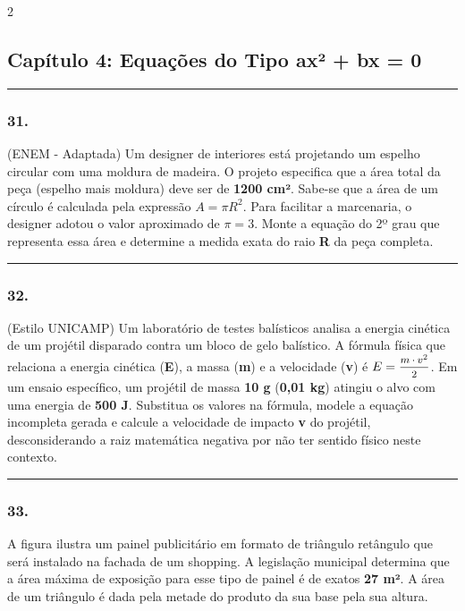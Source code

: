 \documentclass[twoside, 10pt, a4paper]{article}
\newlength{\espacoPosTitulo}\setlength{\espacoPosTitulo}{0.3cm}
\newlength{\espacoPreQuestao}\setlength{\espacoPreQuestao}{0.1cm}
\newlength{\espacoQuestao}\setlength{\espacoQuestao}{0.2cm}
\begin{document}
\begin{multicols*}{2}
\subsection*{Capítulo 4: Equações do Tipo ax² + bx = 0}
\vspace{-0.2cm}\noindent\rule{\linewidth}{1.5pt} 
\par\vspace{\espacoPosTitulo}
\subsubsection*{31.} (ENEM - Adaptada) Um designer de interiores está projetando um espelho circular com uma moldura de madeira. O projeto especifica que a área total da peça (espelho mais moldura) deve ser de \textbf{1200 cm²}. Sabe-se que a área de um círculo é calculada pela expressão $ A = \pi R^2 $. Para facilitar a marcenaria, o designer adotou o valor aproximado de $ \pi = 3 $. Monte a equação do 2º grau que representa essa área e determine a medida exata do raio \textbf{R} da peça completa.
\par\vspace{\espacoQuestao}

\noindent\textcolor{CorLinha}{\rule{\linewidth}{0.5pt}} 
\par\vspace{\espacoPreQuestao}
\subsubsection*{32.} (Estilo UNICAMP) Um laboratório de testes balísticos analisa a energia cinética de um projétil disparado contra um bloco de gelo balístico. A fórmula física que relaciona a energia cinética (\textbf{E}), a massa (\textbf{m}) e a velocidade (\textbf{v}) é $ E = \mfrac{m \cdot v^2}{2} $. Em um ensaio específico, um projétil de massa \textbf{10 g} (\textbf{0,01 kg}) atingiu o alvo com uma energia de \textbf{500 J}. Substitua os valores na fórmula, modele a equação incompleta gerada e calcule a velocidade de impacto \textbf{v} do projétil, desconsiderando a raiz matemática negativa por não ter sentido físico neste contexto.
\par\vspace{\espacoQuestao}

\noindent\textcolor{CorLinha}{\rule{\linewidth}{0.5pt}} 
\par\vspace{\espacoPreQuestao}
\subsubsection*{33.} A figura ilustra um painel publicitário em formato de triângulo retângulo que será instalado na fachada de um shopping. A legislação municipal determina que a área máxima de exposição para esse tipo de painel é de exatos \textbf{27 m²}. A área de um triângulo é dada pela metade do produto da sua base pela sua altura.


\end{multicols*}
\end{document}
